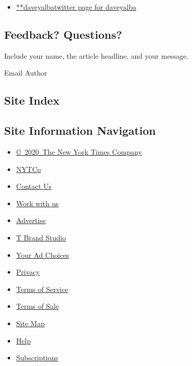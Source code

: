 \begin{itemize}
\tightlist
\item
  \href{https://twitter.com/daveyalba}{**daveyalbatwitter page for
  daveyalba}
\end{itemize}

\hypertarget{feedback-questions}{%
\subsection{Feedback? Questions?}\label{feedback-questions}}

Include your name, the article headline, and your message.

Email Author

\hypertarget{site-index}{%
\subsection{Site Index}\label{site-index}}

\hypertarget{site-information-navigation}{%
\subsection{Site Information
Navigation}\label{site-information-navigation}}

\begin{itemize}
\tightlist
\item
  \href{https://help.nytimes.com/hc/en-us/articles/115014792127-Copyright-notice}{©~2020~The
  New York Times Company}
\end{itemize}

\begin{itemize}
\tightlist
\item
  \href{https://www.nytco.com/}{NYTCo}
\item
  \href{https://help.nytimes.com/hc/en-us/articles/115015385887-Contact-Us}{Contact
  Us}
\item
  \href{https://www.nytco.com/careers/}{Work with us}
\item
  \href{https://nytmediakit.com/}{Advertise}
\item
  \href{http://www.tbrandstudio.com/}{T Brand Studio}
\item
  \href{https://www.nytimes.com/privacy/cookie-policy\#how-do-i-manage-trackers}{Your
  Ad Choices}
\item
  \href{https://www.nytimes.com/privacy}{Privacy}
\item
  \href{https://help.nytimes.com/hc/en-us/articles/115014893428-Terms-of-service}{Terms
  of Service}
\item
  \href{https://help.nytimes.com/hc/en-us/articles/115014893968-Terms-of-sale}{Terms
  of Sale}
\item
  \href{https://spiderbites.nytimes.com}{Site Map}
\item
  \href{https://help.nytimes.com/hc/en-us}{Help}
\item
  \href{https://www.nytimes.com/subscription?campaignId=37WXW}{Subscriptions}
\end{itemize}
